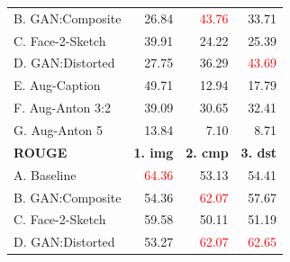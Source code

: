 \documentclass[aspectratio=1610]{beamer} %
\begin{document}
\begin{frame}
\begin{table}[htbp]
{\begin{tabular}{|l|rrr|}
B. GAN:Composite        & 26.84                                                    &\textcolor{red}{ 43.76}                                               & 33.71                                                      \\
C. Face-2-Sketch       & 39.91                                                    & 24.22                                                     & 25.39                                                      \\
D. GAN:Distorted         & 27.75                                                    & 36.29                                                     & \textcolor{red}{43.69}
\\
\hdashline
E. Aug-Caption             & 49.71                                                  & 12.94                                                     & 17.79                                                      \\
F. Aug-Anton 3:2 & 39.09                                                    & 30.65                                                & 32.41                                                 \\
G. Aug-Anton 5   & 13.84                                                    & 7.10                                                      & 8.71                                                       \\
\hline
\hline
\textbf{ROUGE} & \textbf{1. img} & \textbf{2. cmp} & \textbf{3. dst} \\ 
\hline
A. Baseline          & \textcolor{red}{64.36}                                                & 53.13                                                     & 54.41                                                      \\
B. GAN:Composite        & 54.36                                                    & \textcolor{red}{62.07}                                               & 57.67                                                      \\
C. Face-2-Sketch       & 59.58                                                    & 50.11                                                     & 51.19                                                      \\
D. GAN:Distorted         & 53.27                                                    & \textcolor{red}{62.07}                                                   & \textcolor{red}{62.65}                                                   \\

\end{tabular}}
\end{table}
\end{frame}
\end{document}
